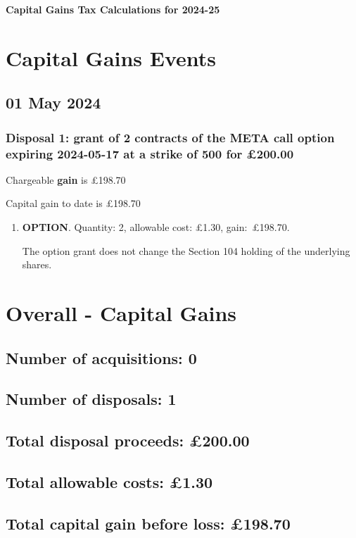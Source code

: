\documentclass{article}
\begin{document}
\centerline{\Large\bfseries Capital Gains Tax Calculations for 2024-25}

\section*{Capital Gains Events}


\subsection*{01 May 2024}
\subsubsection*{
    Disposal 1: grant of 2
    contracts of the META call option expiring 2024-05-17 at a strike of 500
    for £200.00
}
Chargeable \textbf{gain} is £198.70

Capital gain to date is £198.70

\begin{enumerate}
\item \textbf{OPTION}. Quantity: 2,
    allowable
    cost:
    £1.30,
    \mbox{gain: £198.70.}

    The option grant does not change the Section 104 holding of the underlying shares.

\end{enumerate}




\clearpage
\section*{Overall - Capital Gains}
\subsection*{Number of acquisitions: 0}
\subsection*{Number of disposals: 1}
\subsection*{Total disposal proceeds: £200.00}
\subsection*{Total allowable costs: £1.30}
\subsection*{Total capital gain before loss: £198.70}
\end{document}
